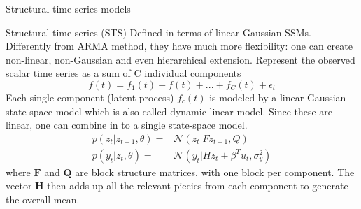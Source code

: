 \documentclass[11pt]{beamer}
\begin{document}

\begin{frame}{Structural time series models \cite{pml2Book}}
\small
\begin{alertblock}{Structural time series (STS)}
Defined in terms of linear-Gaussian SSMs. Differently from ARMA method, they have much more flexibility: one can create non-linear, non-Gaussian and even hierarchical extension.
Represent the observed scalar time series as a sum of C individual components
\begin{equation*}
f(t)=f_{1}(t)+f(t)+...+f_{C}(t)+\epsilon_{t}
\end{equation*}
Each single component (latent process) $f_{c}(t)$ is modeled by a linear Gaussian state-space model which is also called dynamic linear model. Since these are linear, one can combine in to a single state-space model. 
\begin{equation*}
\begin{split}
p(z_{t}|z_{t-1},\theta)= & \mathcal{N}(z_{t}|Fz_{t-1},Q) \\
p(y_{t}|z_{t},\theta)= & \mathcal{N}(y_{t}|Hz_{t}+\beta^{T}u_{t},\sigma^{2}_{y})
\end{split}
\end{equation*}
where $\bm{F}$ and $\bm{Q}$ are block structure matrices, with one block per component. The vector $\bm{H}$ then adds up all the relevant piecies from each component to generate the overall mean. 
\end{alertblock}
\end{frame}
\end{document}
